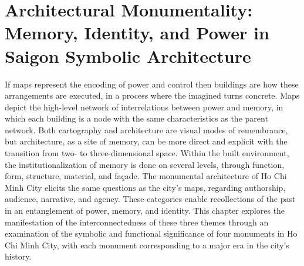 \chapter[Architectural Monumentality]{Architectural Monumentality: Memory, Identity, and Power in Saigon Symbolic Architecture}\label{symbol}

If maps represent the encoding of power and control then buildings are how these arrangements are executed, in a process where the imagined turns concrete. Maps depict the high-level network of interrelations between power and memory, in which each building is a node with the same characteristics as the parent network. Both cartography and architecture are visual modes of remembrance, but architecture, as a site of memory, can be more direct and explicit with the transition from two- to three-dimensional space. Within the built environment, the institutionalization of memory is done on several levels, through function, form, structure, material, and façade. The monumental architecture of Ho Chi Minh City elicits the same questions as the city’s maps, regarding authorship, audience, narrative, and agency. These categories enable recollections of the past in an entanglement of power, memory, and identity. This chapter explores the manifestation of the interconnectedness of these three themes through an examination of the symbolic and functional significance of four monuments in Ho Chi Minh City, with each monument corresponding to a major era in the city’s history.
\vi


